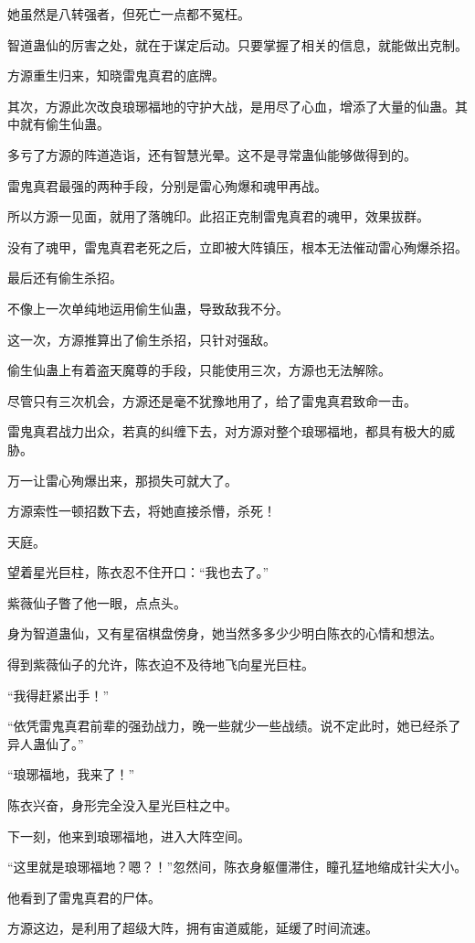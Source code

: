 \begin{this_body}
她虽然是八转强者，但死亡一点都不冤枉。

智道蛊仙的厉害之处，就在于谋定后动。只要掌握了相关的信息，就能做出克制。

方源重生归来，知晓雷鬼真君的底牌。

其次，方源此次改良琅琊福地的守护大战，是用尽了心血，增添了大量的仙蛊。其中就有偷生仙蛊。

多亏了方源的阵道造诣，还有智慧光晕。这不是寻常蛊仙能够做得到的。

雷鬼真君最强的两种手段，分别是雷心殉爆和魂甲再战。

所以方源一见面，就用了落魄印。此招正克制雷鬼真君的魂甲，效果拔群。

没有了魂甲，雷鬼真君老死之后，立即被大阵镇压，根本无法催动雷心殉爆杀招。

最后还有偷生杀招。

不像上一次单纯地运用偷生仙蛊，导致敌我不分。

这一次，方源推算出了偷生杀招，只针对强敌。

偷生仙蛊上有着盗天魔尊的手段，只能使用三次，方源也无法解除。

尽管只有三次机会，方源还是毫不犹豫地用了，给了雷鬼真君致命一击。

雷鬼真君战力出众，若真的纠缠下去，对方源对整个琅琊福地，都具有极大的威胁。

万一让雷心殉爆出来，那损失可就大了。

方源索性一顿招数下去，将她直接杀懵，杀死！

天庭。

望着星光巨柱，陈衣忍不住开口：“我也去了。”

紫薇仙子瞥了他一眼，点点头。

身为智道蛊仙，又有星宿棋盘傍身，她当然多多少少明白陈衣的心情和想法。

得到紫薇仙子的允许，陈衣迫不及待地飞向星光巨柱。

“我得赶紧出手！”

“依凭雷鬼真君前辈的强劲战力，晚一些就少一些战绩。说不定此时，她已经杀了异人蛊仙了。”

“琅琊福地，我来了！”

陈衣兴奋，身形完全没入星光巨柱之中。

下一刻，他来到琅琊福地，进入大阵空间。

“这里就是琅琊福地？嗯？！”忽然间，陈衣身躯僵滞住，瞳孔猛地缩成针尖大小。

他看到了雷鬼真君的尸体。

方源这边，是利用了超级大阵，拥有宙道威能，延缓了时间流速。


\end{this_body}
